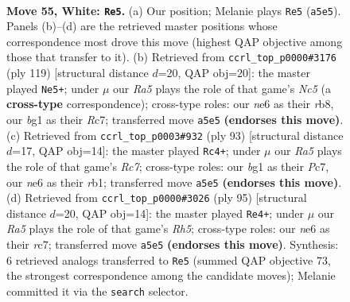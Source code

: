 \documentclass[11pt]{article}
\begin{document}
\clearpage

\begin{figure}[p]\centering
\begin{subfigure}{0.46\textwidth}\centering
\resizebox{\linewidth}{!}{%
\newchessgame
\chessboard[
  setfen={3k4/8/3Nn3/R5P1/P7/7r/8/4K1b1 w - - 0 55},
  showmover=false,
  pgfstyle=straightmove, color=movearrow, markmove={a5-e5}
]}
\caption{}
\end{subfigure}\hfill
\begin{subfigure}{0.46\textwidth}\centering
\resizebox{\linewidth}{!}{%
\newchessgame
\chessboard[
  setfen={1R6/2r2k2/1p6/8/2nN4/5K2/8/8 b - - 10 60},
  showmover=false,
  pgfstyle=straightmove, color=movearrow, markmove={c4-e5}
]}
\caption{}
\end{subfigure}
\\[4pt]
\begin{subfigure}{0.46\textwidth}\centering
\resizebox{\linewidth}{!}{%
\newchessgame
\chessboard[
  setfen={8/2p5/5k2/8/6K1/3N4/1pr5/1R6 b - - 3 47},
  showmover=false,
  pgfstyle=straightmove, color=movearrow, markmove={c2-c4}
]}
\caption{}
\end{subfigure}\hfill
\begin{subfigure}{0.46\textwidth}\centering
\resizebox{\linewidth}{!}{%
\newchessgame
\chessboard[
  setfen={5k2/2R5/4K3/7p/2p4r/8/8/8 b - - 1 48},
  showmover=false,
  pgfstyle=straightmove, color=movearrow, markmove={h4-e4}
]}
\caption{}
\end{subfigure}
\caption{\textbf{Move 55, White: \texttt{Re5}.} (a) Our position; Melanie plays \texttt{Re5} (\texttt{a5e5}). Panels (b)--(d) are the retrieved master positions whose correspondence most drove this move (highest QAP objective among those that transfer to it). (b) Retrieved from \texttt{ccrl\_top\_p0000\#3176} (ply 119) [structural distance $d$=20, QAP obj=20]: the master played \texttt{Ne5+}; under $\mu$ our \emph{Ra5} plays the role of that game's \emph{Nc5} (a \textbf{cross-type} correspondence); cross-type roles: our \emph{n}e6 as their \emph{r}b8, our \emph{b}g1 as their \emph{R}c7; transferred move \texttt{a5e5} \textbf{(endorses this move)}. (c) Retrieved from \texttt{ccrl\_top\_p0003\#932} (ply 93) [structural distance $d$=17, QAP obj=14]: the master played \texttt{Rc4+}; under $\mu$ our \emph{Ra5} plays the role of that game's \emph{Rc7}; cross-type roles: our \emph{b}g1 as their \emph{P}c7, our \emph{n}e6 as their \emph{r}b1; transferred move \texttt{a5e5} \textbf{(endorses this move)}. (d) Retrieved from \texttt{ccrl\_top\_p0000\#3026} (ply 95) [structural distance $d$=20, QAP obj=14]: the master played \texttt{Re4+}; under $\mu$ our \emph{Ra5} plays the role of that game's \emph{Rh5}; cross-type roles: our \emph{n}e6 as their \emph{r}c7; transferred move \texttt{a5e5} \textbf{(endorses this move)}. Synthesis: 6 retrieved analogs transferred to \texttt{Re5} (summed QAP objective 73, the strongest correspondence among the candidate moves); Melanie committed it via the \texttt{search} selector.}
\label{fig:thought-m108}
\end{figure}
\end{document}
